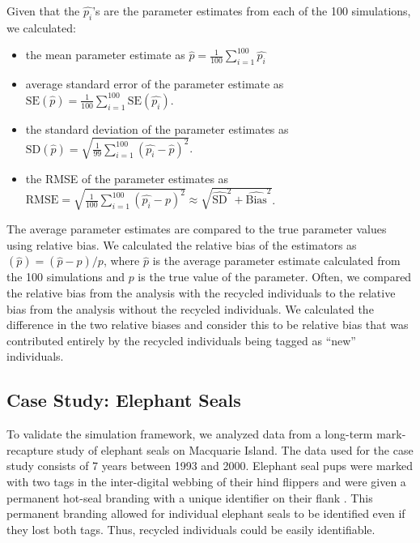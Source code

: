 \documentclass[]{article}
\providecommand{\tightlist}{%
  \setlength{\itemsep}{0pt}\setlength{\parskip}{0pt}}
\begin{document}
Given that the \(\hat{p_i}\)'s are the parameter estimates from each of
the 100 simulations, we calculated:

\begin{itemize}
\tightlist
\item
  the mean parameter estimate as
  \(\hat{p}= \frac{1}{100} \sum_{i=1}^{100} \hat{p_i}\)
\item
  average standard error of the parameter estimate as
  \(\text{SE}(\hat{p})= \frac{1}{100} \sum_{i=1}^{100} \text{SE}(\hat{p_i})\).
\item
  the standard deviation of the parameter estimates as
  \(\text{SD}(\hat{p})= \sqrt{\frac{1}{99} \sum_{i=1}^{100} (\hat{p_i}-\hat{p})^2}\).
\item
  the RMSE of the parameter estimates as
  \(\text{RMSE}= \sqrt{\frac{1}{100} \sum_{i=1}^{100} (\hat{p_i}-p)^2} \approx \sqrt{\hat{\text{SD}}^2+\hat{\text{Bias}}^2}\).
\end{itemize}

The average parameter estimates are compared to the true parameter
values using relative bias. We calculated the relative bias of the
estimators as \(\left(\hat{p}\right) =(\hat{p} -p)/p\), where
\(\hat{p}\) is the average parameter estimate calculated from the 100
simulations and \(p\) is the true value of the parameter. Often, we
compared the relative bias from the analysis with the recycled
individuals to the relative bias from the analysis without the recycled
individuals. We calculated the difference in the two relative biases and
consider this to be relative bias that was contributed entirely by the
recycled individuals being tagged as ``new'' individuals.

\subsection{Case Study: Elephant Seals}\label{case-study-elephant-seals}

To validate the simulation framework, we analyzed data from a long-term
mark-recapture study of elephant seals on Macquarie Island. The data
used for the case study consists of 7 years between 1993 and 2000.
Elephant seal pups were marked with two tags in the inter-digital
webbing of their hind flippers and were given a permanent hot-seal
branding with a unique identifier on their flank \citep{McMahon:2009}. This
permanent branding allowed for individual elephant seals to be
identified even if they lost both tags. Thus, recycled individuals could
be easily identifiable.
\end{document}
